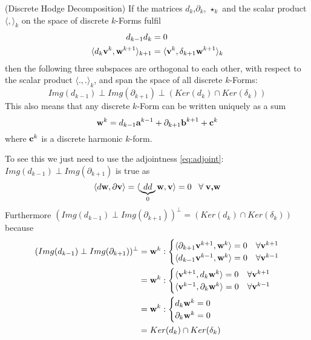 \begin{thm}(Discrete Hodge Decomposition) If the matrices $d_k$,$\partial_k$, $\star_k$ and the scalar product $\langle , \rangle_k$ on the space of discrete $k$-Forms fulfil
\begin{align}
d_{k-1} d_{k} &= 0 \\
\langle  d_k\textbf{v}^k,\textbf{w}^{k+1} \rangle_{k+1} &= \langle  \textbf{v}^k,\delta_{k+1}\textbf{w}^{k+1} \rangle_k \label{eq:adjoint}
\end{align}
then the following three subspaces are orthogonal to each other, with respect to the scalar product $\langle.,.\rangle_k$, and span the space of all discrete $k$-Forms:
\[Img(d_{k-1}) \perp Img (\partial_{k+1}) \perp \left(Ker(d_k) \cap Ker(\delta_k)\right)\]
This also means that any discrete $k$-Form can be written uniquely as a sum
\[\textbf{w}^k = d_{k-1} \textbf{a}^{k-1} + \partial_{k+1} \textbf{b}^{k+1} + \textbf{c}^k\]
where $\textbf{c}^k$ is a discrete harmonic $k$-form.
\end{thm}

To see this we just need to use the adjointness \ref{eq:adjoint}: $Img(d_{k-1}) \perp Img (\partial_{k+1})$ is true as
\[\langle d \textbf{w} , \partial \textbf{v}\rangle = \langle \underbrace{dd}_{0} \textbf{w} , \textbf{v} \rangle = 0 \;\;\; \forall\; \textbf{v,w}\]
Furthermore $(Img(d_{k-1}) \perp Img (\partial_{k+1}))^\perp = \left(Ker(d_k) \cap Ker(\delta_k)\right)$ because
\begin{align*}
(Img(d_{k-1}) \perp Img (\partial_{k+1}))^\perp &= \textbf{w}^k: \begin{cases} \langle \partial_{k+1}\textbf{v}^{k+1},\textbf{w}^k \rangle = 0 & \forall \textbf{v}^{k+1}\\
\langle d_{k-1}\textbf{v}^{k-1},\textbf{w}^k \rangle = 0 & \forall \textbf{v}^{k-1}\end{cases} \\
&= \textbf{w}^k: \begin{cases} \langle \textbf{v}^{k+1},d_{k}\textbf{w}^k \rangle = 0 & \forall \textbf{v}^{k+1}\\
\langle \textbf{v}^{k-1},\partial_{k}\textbf{w}^k \rangle = 0 & \forall \textbf{v}^{k-1}\end{cases} \\
&= \textbf{w}^k: \begin{cases} d_{k}\textbf{w}^k = 0 \\
\partial_{k}\textbf{w}^k  = 0 \end{cases}\\
&= Ker(d_k) \cap Ker(\delta_k)
\end{align*}


